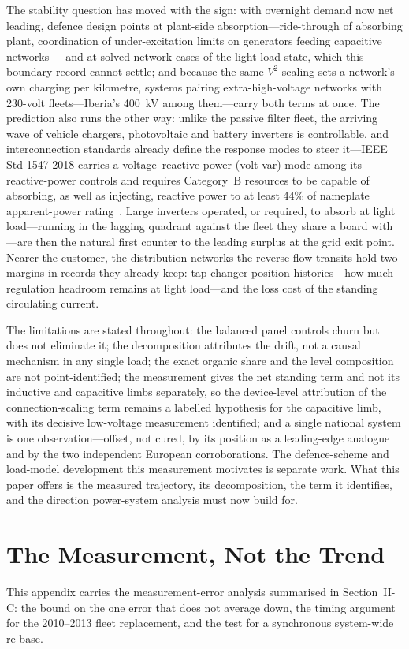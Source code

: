 \documentclass[journal]{IEEEtran}
\begin{document}
The stability question has moved with the sign: with overnight demand now
net leading, defence design points at plant-side absorption---ride-through of
absorbing plant, coordination of under-excitation limits on generators
feeding capacitive networks~\cite{vournas2021}---and at solved network cases
of the light-load state, which this boundary record cannot settle; and
because the same $V^2$ scaling sets a network's own charging per kilometre,
systems pairing extra-high-voltage networks with 230-volt fleets---Iberia's
400~kV among them---carry both terms at once. The prediction also runs the
other way: unlike the passive filter fleet, the arriving wave of vehicle
chargers, photovoltaic and battery inverters is controllable, and
interconnection standards already define the response modes to steer
it---IEEE Std 1547-2018 carries a voltage--reactive-power (volt-var) mode
among its reactive-power controls and requires Category~B resources to be
capable of absorbing, as well as injecting, reactive power to at least 44\%
of nameplate apparent-power rating~\cite{ieee1547}. Large inverters operated,
or required, to absorb at light load---running in the lagging quadrant
against the fleet they share a board with---are then the natural first
counter to the leading surplus at the grid exit point. Nearer the customer,
the distribution networks the reverse flow transits hold two margins in
records they already keep: tap-changer position histories---how much
regulation headroom remains at light load---and the loss cost of the
standing circulating current.

The limitations are stated throughout: the balanced panel controls churn but does
not eliminate it; the decomposition attributes the drift, not a causal mechanism in
any single load; the exact organic share and the level composition are not
point-identified; the measurement gives the net standing term and not its
inductive and capacitive limbs separately, so the device-level attribution of
the connection-scaling term remains a labelled hypothesis for the capacitive
limb, with its decisive low-voltage measurement identified; and a single national system is one observation---offset, not cured, by its
position as a leading-edge analogue and by the two independent European
corroborations. The defence-scheme and load-model development this measurement
motivates is separate work. What this paper offers is the measured trajectory,
its decomposition, the term it identifies, and the direction power-system
analysis must now build for.

\appendices
\section{The Measurement, Not the Trend}
This appendix carries the measurement-error analysis summarised in
Section~II-C: the bound on the one error that does not average down, the timing
argument for the 2010--2013 fleet replacement, and the test for a synchronous
system-wide re-base.
\end{document}
